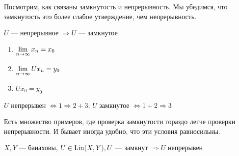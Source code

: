 \documentclass[document]{subfiles}
\begin{document}
Посмотрим, как связаны замкнутость и непрерывность. Мы убедимся, что замкнутость это более слабое утверждение, чем непрерывность.

\begin{remark}
    $U$ --- непрерывное $\Rightarrow U$ --- замкнутое
    \begin{enumerate}
        \item $\lim\limits_{n \to \infty} x_n = x_0 $
        \item $\lim\limits_{n \to \infty} Ux_n = y_0$
        \item $Ux_0 = y_0$
    \end{enumerate}
    $U \text{ непрерывен } \Leftrightarrow 1 \Rightarrow 2 + 3$; $U \text{ замкнутое } \Leftrightarrow 1 + 2 \Rightarrow 3$
\end{remark}

Есть множество примеров, где проверка замкнутости гораздо легче проверки непрерывности. И бывает иногда удобно, что эти условия равносильны.

\begin{theorem*}
    $X,Y$ --- банаховы, $U \in \operatorname{Lin}(X,Y), U$ --- замкнут $\Rightarrow U$ непрерывен
\end{theorem*}
\end{document}
